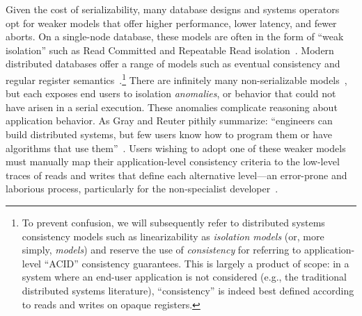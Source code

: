 Given the cost of serializability, many database designs and systems
operators opt for weaker models that offer higher performance, lower
latency, and fewer aborts. On a single-node database, these models are
often in the form of ``weak isolation'' such as Read Committed and
Repeatable Read isolation~\cite{adya-isolation}. Modern distributed
databases offer a range of models such as eventual consistency and
regular register semantics~\cite{hat-vldb}.\footnote{To prevent
  confusion, we will subsequently refer to distributed systems
  consistency models such as linearizability as \textit{isolation
    models} (or, more simply, \textit{models}) and reserve the use of
  \textit{consistency} for referring to application-level ``ACID''
  consistency guarantees. This is largely a product of scope: in a
  system where an end-user application is not considered (e.g., the
  traditional distributed systems literature), ``consistency'' is
  indeed best defined according to reads and writes on opaque
  registers.}  There are infinitely many non-serializable
models~\cite{hat-vldb}, but each exposes end users to isolation
\textit{anomalies}, or behavior that could not have arisen in a serial
execution. These anomalies complicate reasoning about application
behavior. As Gray and Reuter pithily summarize: ``engineers can build
distributed systems, but few users know how to program them or have
algorithms that use them''~\cite{gray-book}. Users wishing to adopt
one of these weaker models must manually map their application-level
consistency criteria to the low-level traces of reads and writes that
define each alternative level---an error-prone and laborious process,
particularly for the non-specialist
developer~\cite{consistency-borders}.


